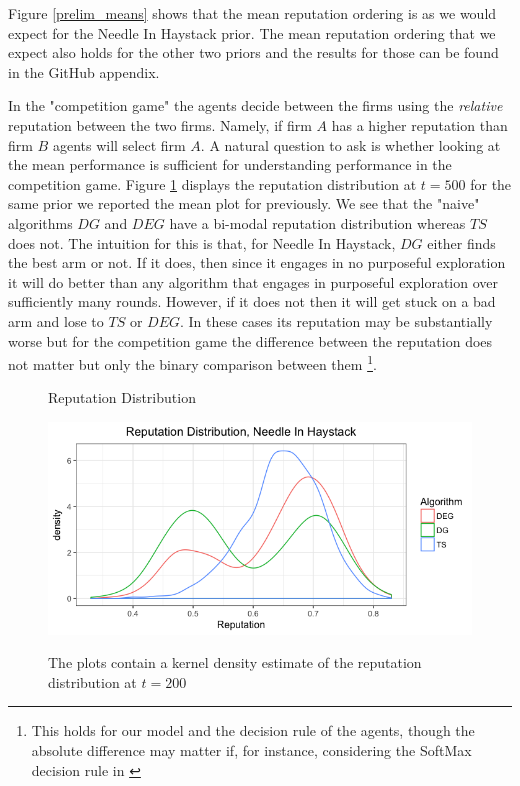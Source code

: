 \documentclass{article}
\theoremstyle{definition}
\begin{document}
Figure \ref{prelim_means} shows that the mean reputation ordering is as we would expect for the Needle In Haystack prior. The mean reputation ordering that we expect also holds for the other two priors and the results for those can be found in the GitHub appendix.

In the "competition game" the agents decide between the firms using the \textit{relative} reputation between the two firms. Namely, if firm $A$ has a higher reputation than firm $B$ agents will select firm $A$. A natural question to ask is whether looking at the mean performance is sufficient for understanding performance in the competition game. Figure \ref{rep_dist_nih} displays the reputation distribution at $t = 500$ for the same prior we reported the mean plot for previously. We see that the "naive" algorithms $DG$ and $DEG$ have a bi-modal reputation distribution whereas $TS$ does not. The intuition for this is that, for Needle In Haystack, $DG$ either finds the best arm or not. If it does, then since it engages in no purposeful exploration it will do better than any algorithm that engages in purposeful exploration over sufficiently many rounds. However, if it does not then it will get stuck on a bad arm and lose to $TS$ or $DEG$. In these cases its reputation may be substantially worse but for the competition game the difference between the reputation does not matter but only the binary comparison between them \footnote{This holds for our model and the decision rule of the agents, though the absolute difference may matter if, for instance, considering the SoftMax decision rule in \citet{mansour2018competing}}.

\begin{figure}
\caption{Reputation Distribution}
\includegraphics[scale=0.35]{figures/rep_distribution_nih}
\label{rep_dist_nih}
\caption*{\tiny{The plots contain a kernel density estimate of the reputation distribution at $t = 200$}}
\end{figure}
\end{document}
